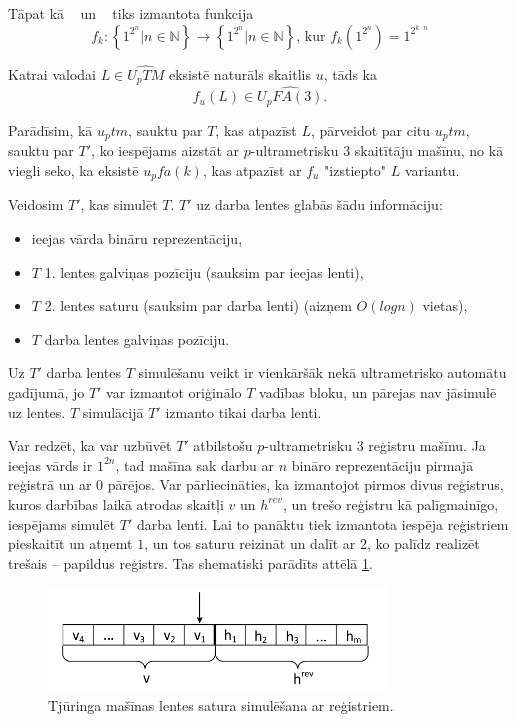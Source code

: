 \documentclass{ludis}
\begin{document}
Tāpat kā ~\citep{Macarie1995} un ~\citep{Monien1980} tiks izmantota funkcija
\[
	f_k : \left\{ 1^{2^n} | n \in \mathbb{N} \right\} \rightarrow \left\{ 1^{2^n} | n \in \mathbb{N} \right\} \textrm{, kur } f_k( 1^{2^n}) = 1^{2^{k \cdot n}}
\]

\begin{lemma} \label{skaititaji}
Katrai valodai $L \in \widehat{U_pTM}$ eksistē naturāls skaitlis $u$, tāds ka
\[
	f_u(L) \in \widehat{U_pFA(3)}.
\]
\end{lemma}
\begin{pieradijums}
Parādīsim, kā $u_ptm$, sauktu par $T$, kas atpazīst $L$, pārveidot par citu $u_ptm$, sauktu par $T'$, ko iespējams aizstāt ar $p$-ultrametrisku $3$ skaitītāju mašīnu, no kā viegli seko, ka eksistē $u_pfa(k)$, kas atpazīst ar $f_u$ "izstiepto" $L$ variantu.

Veidosim $T'$, kas simulēt $T$. $T'$ uz darba lentes glabās šādu informāciju:
\begin{itemize}
	\item ieejas vārda bināru reprezentāciju,
	\item $T$ 1. lentes galviņas pozīciju (sauksim par ieejas lenti),
	\item $T$ 2. lentes saturu (sauksim par darba lenti) (aizņem $O(log n)$ vietas),
	\item $T$ darba lentes galviņas pozīciju.
\end{itemize} %
Uz $T'$ darba lentes $T$ simulēšanu veikt ir vienkāršāk nekā ultrametrisko automātu gadījumā, jo $T'$ var izmantot oriģinālo $T$ vadības bloku, un pārejas nav jāsimulē uz lentes. $T$ simulācijā $T'$ izmanto tikai darba lenti.

Var redzēt, ka var uzbūvēt $T'$ atbilstošu $p$-ultrametrisku $3$ reģistru mašīnu. Ja ieejas vārds ir $1^{2n}$, tad mašīna sak darbu ar $n$ bināro reprezentāciju pirmajā reģistrā un ar $0$ pārējos. Var pārliecināties, ka izmantojot pirmos divus reģistrus, kuros darbības laikā atrodas skaitļi $v$ un $h^{rev}$, un trešo reģistru kā palīgmainīgo, iespējams simulēt $T'$ darba lenti. Lai to panāktu tiek izmantota iespēja reģistriem pieskaitīt un atņemt $1$, un tos saturu reizināt un dalīt ar $2$, ko palīdz realizēt trešais -- papildus reģistrs. Tas shematiski parādīts attēlā \ref{fig:skaititaji}.

\begin{figure}[h!]
\centering
\includegraphics[width=0.8\textwidth]{Img/skaititaji.pdf}
\caption{Tjūringa mašīnas lentes satura simulēšana ar reģistriem.}
\label{fig:skaititaji}
\end{figure}


\end{pieradijums}
\end{document}
